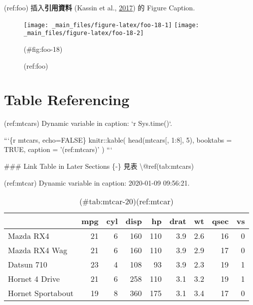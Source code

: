 \documentclass[oneside]{book}
\newenvironment{Shaded}{\begin{snugshade}}{\end{snugshade}}
\newcommand{\BaseNTok}[1]{\textcolor[rgb]{0.00,0.00,0.81}{#1}}
\newcommand{\FunctionTok}[1]{\textcolor[rgb]{0.00,0.00,0.00}{#1}}
\newcommand{\NormalTok}[1]{#1}
\begin{document}
(ref:foo) 插入\textbf{引用資料} (Kassin et al., \protect\hyperlink{ref-kassin2017}{2017}) 的 Figure Caption.

\begin{figure}

{\centering \texttt{[image: \_main\_files/figure-latex/foo-18-1]} \texttt{[image: \_main\_files/figure-latex/foo-18-2]} 

}

\caption{(ref:foo)}(\#fig:foo-18)
\end{figure}

\hypertarget{table-referencing-1}{%
\section{Table Referencing}\label{table-referencing-1}}

\begin{Shaded}
\begin{Highlighting}[]
\NormalTok{(ref:mtcars) Dynamic variable in caption: }\BaseNTok{`r Sys.time()`}\NormalTok{.}

\BaseNTok{```\{r mtcars, echo=FALSE\}}
\BaseNTok{knitr::kable(}
\BaseNTok{  head(mtcars[, 1:8], 5), booktabs = TRUE,}
\BaseNTok{  caption = '(ref:mtcars)'}
\BaseNTok{  )}
\BaseNTok{```}

\FunctionTok{### Link Table in Later Sections \{-\}}
\NormalTok{見表 \textbackslash{}@ref(tab:mtcars)}
\end{Highlighting}
\end{Shaded}

(ref:mtcar) Dynamic variable in caption: 2020-01-09 09:56:21.

\begin{table}

\caption{(\#tab:mtcar-20)(ref:mtcar)}
\centering
\begin{tabular}[t]{lrrrrrrrr}
\toprule
  & mpg & cyl & disp & hp & drat & wt & qsec & vs\\
\midrule
Mazda RX4 & 21 & 6 & 160 & 110 & 3.9 & 2.6 & 16 & 0\\
Mazda RX4 Wag & 21 & 6 & 160 & 110 & 3.9 & 2.9 & 17 & 0\\
Datsun 710 & 23 & 4 & 108 & 93 & 3.9 & 2.3 & 19 & 1\\
Hornet 4 Drive & 21 & 6 & 258 & 110 & 3.1 & 3.2 & 19 & 1\\
Hornet Sportabout & 19 & 8 & 360 & 175 & 3.1 & 3.4 & 17 & 0\\
\bottomrule
\end{tabular}
\end{table}
\end{document}
